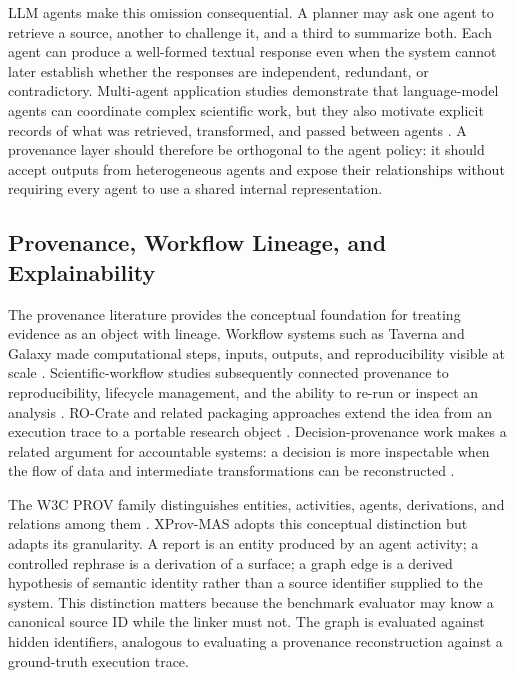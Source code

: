 \documentclass{ieeeaccess}
\begin{document}
LLM agents make this omission consequential. A planner may ask one agent to retrieve a source, another to challenge it, and a third to summarize both. Each agent can produce a well-formed textual response even when the system cannot later establish whether the responses are independent, redundant, or contradictory. Multi-agent application studies demonstrate that language-model agents can coordinate complex scientific work, but they also motivate explicit records of what was retrieved, transformed, and passed between agents \cite{Anona6023067920}. A provenance layer should therefore be orthogonal to the agent policy: it should accept outputs from heterogeneous agents and expose their relationships without requiring every agent to use a shared internal representation.

\subsection{Provenance, Workflow Lineage, and Explainability}
The provenance literature provides the conceptual foundation for treating evidence as an object with lineage. Workflow systems such as Taverna and Galaxy made computational steps, inputs, outputs, and reproducibility visible at scale \cite{Anontticsbth361,Anong2010118r86}. Scientific-workflow studies subsequently connected provenance to reproducibility, lifecycle management, and the ability to re-run or inspect an analysis \cite{Anonw002cpe6544,Anont15ea000136,Anoni5901717470,Anont2017704893}. RO-Crate and related packaging approaches extend the idea from an execution trace to a portable research object \cite{Anonrone0309210}. Decision-provenance work makes a related argument for accountable systems: a decision is more inspectable when the flow of data and intermediate transformations can be reconstructed \cite{Anond0182887201}.

The W3C PROV family distinguishes entities, activities, agents, derivations, and relations among them \cite{w3c2013prov}. XProv-MAS adopts this conceptual distinction but adapts its granularity. A report is an entity produced by an agent activity; a controlled rephrase is a derivation of a surface; a graph edge is a derived hypothesis of semantic identity rather than a source identifier supplied to the system. This distinction matters because the benchmark evaluator may know a canonical source ID while the linker must not. The graph is evaluated against hidden identifiers, analogous to evaluating a provenance reconstruction against a ground-truth execution trace.
\end{document}
